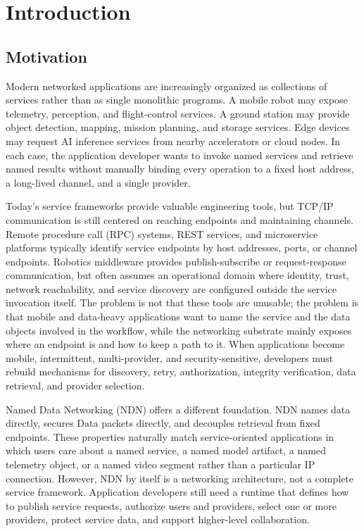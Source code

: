 \chapter{Introduction}
\label{chap:introduction}

\section{Motivation}

Modern networked applications are increasingly organized as collections of
services rather than as single monolithic programs. A mobile robot may expose
telemetry, perception, and flight-control services. A ground station may provide
object detection, mapping, mission planning, and storage services. Edge devices
may request AI inference services from nearby accelerators or cloud nodes. In
each case, the application developer wants to invoke named services and retrieve
named results without manually binding every operation to a fixed host address,
a long-lived channel, and a single provider.

Today's service frameworks provide valuable engineering tools, but TCP/IP
communication is still centered on reaching endpoints and maintaining channels.
Remote procedure call (RPC) systems, REST services, and microservice platforms
typically identify service endpoints by host addresses, ports, or channel
endpoints. Robotics middleware provides publish-subscribe or request-response
communication, but often assumes an operational domain where identity, trust,
network reachability, and service discovery are configured outside the service
invocation itself. The problem is not that these tools are unusable; the problem
is that mobile and data-heavy applications want to name the service and the data
objects involved in the workflow, while the networking substrate mainly exposes
where an endpoint is and how to keep a path to it. When applications become
mobile, intermittent, multi-provider, and security-sensitive, developers must
rebuild mechanisms for discovery, retry, authorization, integrity verification,
data retrieval, and provider selection.

Named Data Networking (NDN) offers a different foundation. NDN names data
directly, secures Data packets directly, and decouples retrieval from fixed
endpoints. These properties naturally match service-oriented applications in
which users care about a named service, a named model artifact, a named
telemetry object, or a named video segment rather than a particular IP
connection. However, NDN by itself is a networking architecture, not a complete
service framework. Application developers still need a runtime that defines how
to publish service requests, authorize users and providers, select one or more
providers, protect service data, and support higher-level collaboration.

